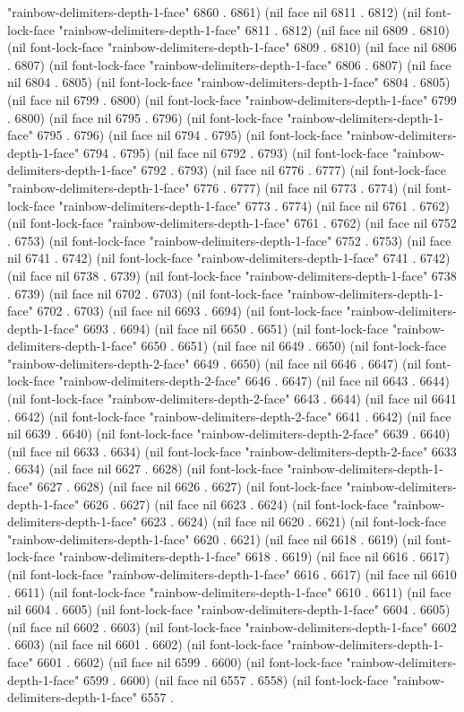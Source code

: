 "rainbow-delimiters-depth-1-face" 6860 . 6861) (nil face nil 6811 . 6812) (nil font-lock-face "rainbow-delimiters-depth-1-face" 6811 . 6812) (nil face nil 6809 . 6810) (nil font-lock-face "rainbow-delimiters-depth-1-face" 6809 . 6810) (nil face nil 6806 . 6807) (nil font-lock-face "rainbow-delimiters-depth-1-face" 6806 . 6807) (nil face nil 6804 . 6805) (nil font-lock-face "rainbow-delimiters-depth-1-face" 6804 . 6805) (nil face nil 6799 . 6800) (nil font-lock-face "rainbow-delimiters-depth-1-face" 6799 . 6800) (nil face nil 6795 . 6796) (nil font-lock-face "rainbow-delimiters-depth-1-face" 6795 . 6796) (nil face nil 6794 . 6795) (nil font-lock-face "rainbow-delimiters-depth-1-face" 6794 . 6795) (nil face nil 6792 . 6793) (nil font-lock-face "rainbow-delimiters-depth-1-face" 6792 . 6793) (nil face nil 6776 . 6777) (nil font-lock-face "rainbow-delimiters-depth-1-face" 6776 . 6777) (nil face nil 6773 . 6774) (nil font-lock-face "rainbow-delimiters-depth-1-face" 6773 . 6774) (nil face nil 6761 . 6762) (nil font-lock-face "rainbow-delimiters-depth-1-face" 6761 . 6762) (nil face nil 6752 . 6753) (nil font-lock-face "rainbow-delimiters-depth-1-face" 6752 . 6753) (nil face nil 6741 . 6742) (nil font-lock-face "rainbow-delimiters-depth-1-face" 6741 . 6742) (nil face nil 6738 . 6739) (nil font-lock-face "rainbow-delimiters-depth-1-face" 6738 . 6739) (nil face nil 6702 . 6703) (nil font-lock-face "rainbow-delimiters-depth-1-face" 6702 . 6703) (nil face nil 6693 . 6694) (nil font-lock-face "rainbow-delimiters-depth-1-face" 6693 . 6694) (nil face nil 6650 . 6651) (nil font-lock-face "rainbow-delimiters-depth-1-face" 6650 . 6651) (nil face nil 6649 . 6650) (nil font-lock-face "rainbow-delimiters-depth-2-face" 6649 . 6650) (nil face nil 6646 . 6647) (nil font-lock-face "rainbow-delimiters-depth-2-face" 6646 . 6647) (nil face nil 6643 . 6644) (nil font-lock-face "rainbow-delimiters-depth-2-face" 6643 . 6644) (nil face nil 6641 . 6642) (nil font-lock-face "rainbow-delimiters-depth-2-face" 6641 . 6642) (nil face nil 6639 . 6640) (nil font-lock-face "rainbow-delimiters-depth-2-face" 6639 . 6640) (nil face nil 6633 . 6634) (nil font-lock-face "rainbow-delimiters-depth-2-face" 6633 . 6634) (nil face nil 6627 . 6628) (nil font-lock-face "rainbow-delimiters-depth-1-face" 6627 . 6628) (nil face nil 6626 . 6627) (nil font-lock-face "rainbow-delimiters-depth-1-face" 6626 . 6627) (nil face nil 6623 . 6624) (nil font-lock-face "rainbow-delimiters-depth-1-face" 6623 . 6624) (nil face nil 6620 . 6621) (nil font-lock-face "rainbow-delimiters-depth-1-face" 6620 . 6621) (nil face nil 6618 . 6619) (nil font-lock-face "rainbow-delimiters-depth-1-face" 6618 . 6619) (nil face nil 6616 . 6617) (nil font-lock-face "rainbow-delimiters-depth-1-face" 6616 . 6617) (nil face nil 6610 . 6611) (nil font-lock-face "rainbow-delimiters-depth-1-face" 6610 . 6611) (nil face nil 6604 . 6605) (nil font-lock-face "rainbow-delimiters-depth-1-face" 6604 . 6605) (nil face nil 6602 . 6603) (nil font-lock-face "rainbow-delimiters-depth-1-face" 6602 . 6603) (nil face nil 6601 . 6602) (nil font-lock-face "rainbow-delimiters-depth-1-face" 6601 . 6602) (nil face nil 6599 . 6600) (nil font-lock-face "rainbow-delimiters-depth-1-face" 6599 . 6600) (nil face nil 6557 . 6558) (nil font-lock-face "rainbow-delimiters-depth-1-face" 6557 . 